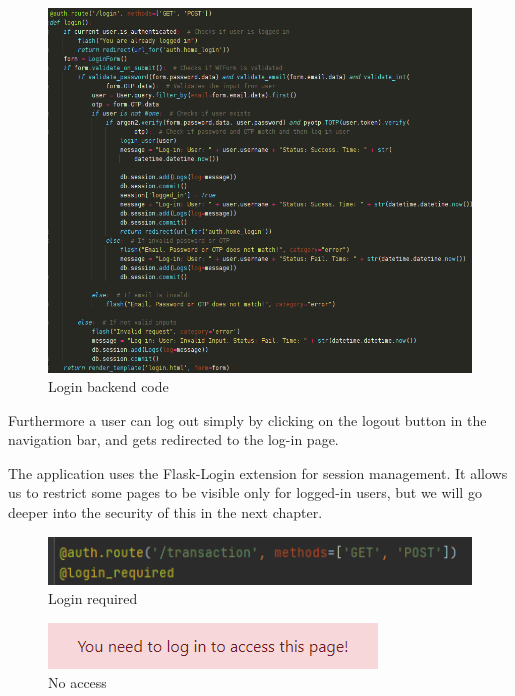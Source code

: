 \begin{figure}[H]
    \centering
    \includegraphics[width=\textwidth]{pics/pic8 login.png}
    \caption{Login backend code}
    \label{fig:cha2fig3logincode}
\end{figure}

Furthermore a user can log out simply by clicking on the logout button in the navigation bar, and gets redirected to the log-in page. 

The application uses the Flask-Login extension for session management. It allows us to restrict some pages to be visible only for logged-in users, but we will go deeper into the security of this in the next chapter. %

\begin{figure}[H]
   \centering
   \includegraphics[width=\textwidth]{pics/pic9.1 loginrequired.PNG}
   \caption{Login required}
   \label{fig:cha2fig3loginrequired}
\end{figure}

\begin{figure}[H]
   \centering
   \includegraphics[width=\textwidth]{pics/pic9.2 need to log in.PNG}
   \caption{No access}
   \label{fig:cha2fig4noaccess}
\end{figure}

